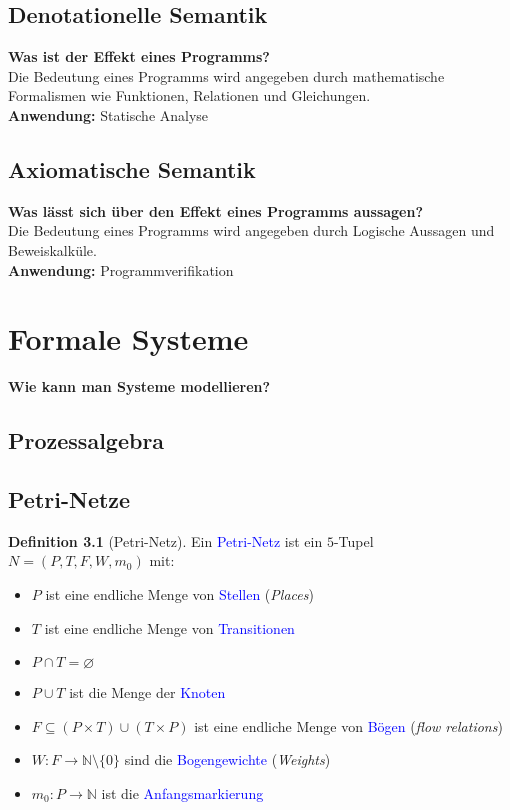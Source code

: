 \documentclass{scrreprt}
\theoremstyle{definition}
\newtheorem{Definition}{Definition}[section]
\theoremstyle{example}
\theoremstyle{algorithm}
\begin{document}
\section{Denotationelle Semantik}
\textbf{\textsf{Was ist der Effekt eines Programms?}}\\
Die Bedeutung eines Programms wird angegeben durch mathematische Formalismen wie Funktionen, Relationen und Gleichungen.\\
\textbf{Anwendung:} Statische Analyse

\section{Axiomatische Semantik}
\textbf{\textsf{Was lässt sich über den Effekt eines Programms aussagen?}}\\
Die Bedeutung eines Programms wird angegeben durch Logische Aussagen und Beweiskalküle.\\
\textbf{Anwendung:} Programmverifikation

\chapter{Formale Systeme}
{\Large\textbf{\textsf{Wie kann man Systeme modellieren?}}}
\section{Prozessalgebra}
\section{Petri-Netze}
\begin{Definition}[Petri-Netz]
Ein \textcolor{blue}{Petri-Netz} ist ein $5$-Tupel $N=(P,T,F,W,m_0)$ mit:
\begin{itemize}
\item
$P$ ist eine endliche Menge von \textcolor{blue}{Stellen} (\textit{Places})
\item
$T$ ist eine endliche Menge von \textcolor{blue}{Transitionen}
\item
$P\cap T = \varnothing$
\item
$P\cup T$ ist die Menge der \textcolor{blue}{Knoten}
\item
$F \subseteq (P\times T) \cup (T \times P)$ ist eine endliche Menge von \textcolor{blue}{Bögen} (\textit{flow relations})
\item
$W: F \rightarrow \mathbb{N} \setminus \{0\}$ sind die \textcolor{blue}{Bogengewichte} (\textit{Weights}) 
\item
$m_0: P \rightarrow \mathbb{N}$ ist die \textcolor{blue}{Anfangsmarkierung}
\end{itemize}
\end{Definition}
\end{document}
